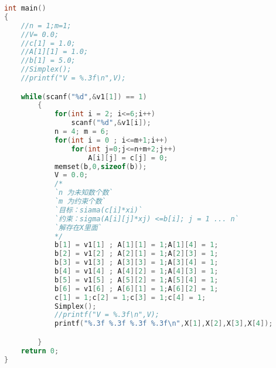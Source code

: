 \begin{lstlisting}[language=c++]
int main()
{
	//n = 1;m=1;
	//V= 0.0;
	//c[1] = 1.0;
	//A[1][1] = 1.0;
	//b[1] = 5.0;
	//Simplex();
	//printf("V = %.3f\n",V);

	while(scanf("%d",&v1[1]) == 1)
		{
			for(int i = 2; i<=6;i++)
				scanf("%d",&v1[i]);
			n = 4; m = 6;
			for(int i = 0 ; i<=m+1;i++)
				for(int j=0;j<=n+m+2;j++)
					A[i][j] = c[j] = 0;
			memset(b,0,sizeof(b));
			V = 0.0;
			/*
			`n 为未知数个数`
			`m 为约束个数`
			`目标：siama(c[i]*xi)`
			`约束：sigma(A[i][j]*xj) <=b[i]; j = 1 ... n`
			`解存在X里面`
			*/
			b[1] = v1[1] ; A[1][1] = 1;A[1][4] = 1;
			b[2] = v1[2] ; A[2][1] = 1;A[2][3] = 1;
			b[3] = v1[3] ; A[3][3] = 1;A[3][4] = 1;
			b[4] = v1[4] ; A[4][2] = 1;A[4][3] = 1;
			b[5] = v1[5] ; A[5][2] = 1;A[5][4] = 1;
			b[6] = v1[6] ; A[6][1] = 1;A[6][2] = 1;
			c[1] = 1;c[2] = 1;c[3] = 1;c[4] = 1;
			Simplex();
			//printf("V = %.3f\n",V);
			printf("%.3f %.3f %.3f %.3f\n",X[1],X[2],X[3],X[4]);

		}
	return 0;
}
	\end{lstlisting}
